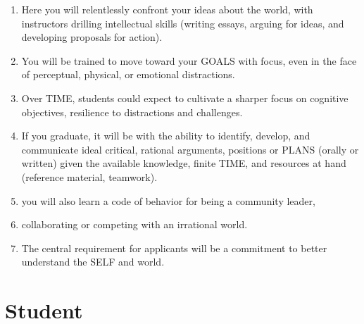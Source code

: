 \documentclass[
]{book}
\providecommand{\tightlist}{%
  \setlength{\itemsep}{0pt}\setlength{\parskip}{0pt}}
\begin{document}
\begin{enumerate}
\def\labelenumi{\arabic{enumi}.}
\setcounter{enumi}{19}
\tightlist
\item
  Here you will relentlessly confront your ideas about the world, with
  instructors drilling intellectual skills (writing essays, arguing
  for ideas, and developing proposals for action).
\item
  You will be trained to move toward your GOALS with focus, even in
  the face of perceptual, physical, or emotional distractions.
\item
  Over TIME, students could expect to cultivate a sharper focus on
  cognitive objectives, resilience to distractions and challenges.
\item
  If you graduate, it will be with the ability to identify, develop,
  and communicate ideal critical, rational arguments, positions or
  PLANS (orally or written) given the available knowledge, finite
  TIME, and resources at hand (reference material, teamwork).
\item
  you will also learn a code of behavior for being a community leader,
\item
  collaborating or competing with an irrational world.
\item
  The central requirement for applicants will be a commitment to
  better understand the SELF and world.
\end{enumerate}

\hypertarget{student}{%
\section{Student}\label{student}}
\end{document}
